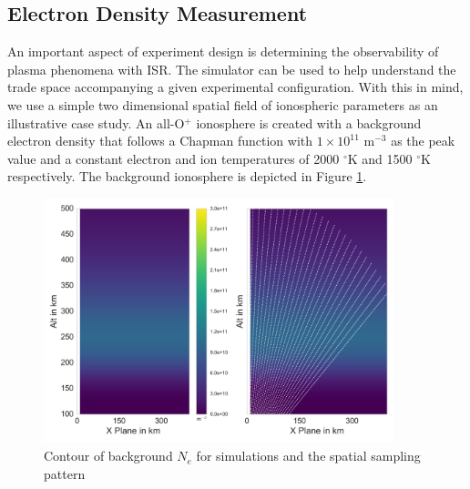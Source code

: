 \documentclass[draft,ras]{agutex}
\begin{document}
\begin{article}
\subsection{Electron Density Measurement}
An important aspect of experiment design is determining the observability of plasma phenomena with ISR. The simulator can be used to help understand the trade space accompanying a given experimental configuration. With this in mind, we use a simple two dimensional spatial field of ionospheric parameters as an illustrative case study. An all-O$^+$ ionosphere is created with a background electron density that follows a Chapman function with $1\times10^{11}$ m$^{-3}$ as the peak value and a constant electron and ion temperatures of 2000 $^\circ$K and 1500 $^\circ$K respectively. The background ionosphere is depicted in Figure \ref{fig:background1}.

\begin{figure}[!t]
\centering
\includegraphics[width=4in]{backgroundandsamp}
\caption{Contour of background $N_e$ for simulations and the spatial sampling pattern}
\label{fig:background1}
\end{figure}


\end{article}
\end{document}
